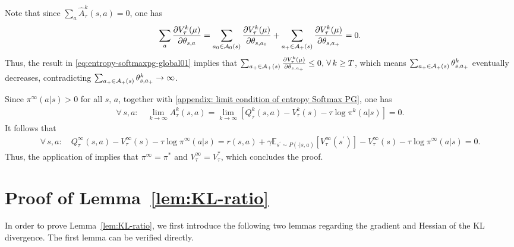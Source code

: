     Note that since $\sum_a\hat{A}^k_\tau(s,a)=0$, one has
    \begin{align*}
        \sum_a \frac{\partial V^k_\tau(\mu)}{\partial \theta_{s,a}} = \sum_{a_0 \in {\cal A}_0(s)} \frac{\partial V^k_\tau(\mu)}{\partial \theta_{s,a_0}} + \sum_{a_+ \in {\cal A}_+(s)} \frac{\partial V^k_\tau(\mu)}{\partial \theta_{s,a_+}} = 0.
    \end{align*}
    Thus, the result in \eqref{eq:entropy-softmaxpg-global01} implies that $\sum_{a_+ \in {\cal A}_+(s)} \frac{\partial V^k_\tau(\mu)}{\partial \theta_{s,a_+}}\leq 0,\,\forall\, k\ge T$, which means  
    $\sum_{a_+ \in {\cal A}_+(s)} \theta^k_{s,a_+}$  eventually decreases, contradicting $\sum_{a_+\in{\cal A}_+(s)} \theta^k_{s,a_+} \to \infty$.
    
    Since $\pi^\infty(a|s) > 0$ for all $s,\,a$, together  with  \eqref{appendix: limit condition of entropy Softmax PG}, one has
    \begin{align*}
        \forall\, s,a: \quad \lim_{k\to\infty} A^k_\tau(s,a) = \lim_{k\to\infty}\left[Q^k_\tau(s,a) - V^k_\tau(s) - \tau \log \pi^k(a|s)\right] = 0.
    \end{align*}
    It follows that 
    \begin{align*}
        \forall\, s,a: 
        \quad Q^\infty_\tau(s,a) - V^\infty_\tau(s) - \tau \log \pi^\infty(a|s)= r(s,a) + \gamma \mathbb{E}_{s^\prime \sim P(\cdot|s,a)} \left[ V^\infty_\tau(s^\prime) \right] - V^\infty_\tau(s) - \tau \log \pi^\infty(a|s) = 0.
    \end{align*}
    Thus, the application of \cite[Corollary~21]{Nachum2017softPI} implies that  $\pi^\infty = \pi^*$ and $V^\infty_\tau = V^*_\tau$, which concludes the proof.


\section{Proof of Lemma~\ref{lem:KL-ratio}}\label{sec:proof-KL-ratio}

In order to prove Lemma~\ref{lem:KL-ratio}, we first introduce the following two lemmas regarding the gradient and Hessian of the KL divergence. The first lemma can be verified directly.

